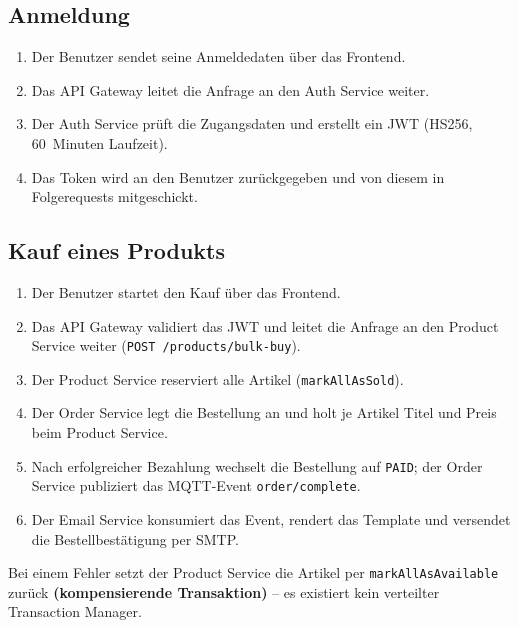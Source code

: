 \documentclass[11pt,a4paper]{article}
\begin{document}
\subsection{Anmeldung}

\begin{enumerate}[leftmargin=1.5em, itemsep=2pt]
  \item Der Benutzer sendet seine Anmeldedaten \"uber das Frontend.
  \item Das API Gateway leitet die Anfrage an den Auth Service weiter.
  \item Der Auth Service pr\"uft die Zugangsdaten und erstellt ein JWT
        (HS256, 60~Minuten Laufzeit).
  \item Das Token wird an den Benutzer zur\"uckgegeben und von diesem
        in Folgerequests mitgeschickt.
\end{enumerate}

\subsection{Kauf eines Produkts}

\begin{enumerate}[leftmargin=1.5em, itemsep=2pt]
  \item Der Benutzer startet den Kauf \"uber das Frontend.
  \item Das API Gateway validiert das JWT und leitet die Anfrage an den
        Product Service weiter (\texttt{POST /products/bulk-buy}).
  \item Der Product Service reserviert alle Artikel
        (\texttt{markAllAsSold}).
  \item Der Order Service legt die Bestellung an und holt je Artikel
        Titel und Preis beim Product Service.
  \item Nach erfolgreicher Bezahlung wechselt die Bestellung auf
        \texttt{PAID}; der Order Service publiziert das MQTT-Event
        \texttt{order/complete}.
  \item Der Email Service konsumiert das Event, rendert das Template und
        versendet die Bestellbest\"atigung per SMTP.
\end{enumerate}

Bei einem Fehler setzt der Product Service die Artikel per
\texttt{markAllAsAvailable} zur\"uck \textbf{(kompensierende
Transaktion)} -- es existiert kein verteilter Transaction Manager.

\end{document}

